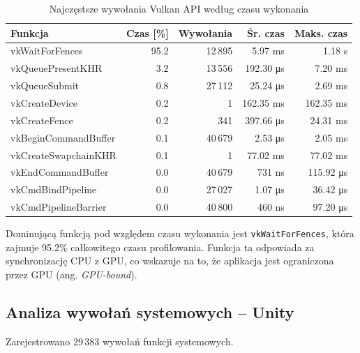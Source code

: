 \begin{table}[htbp]
\centering
\caption{Najczęstsze wywołania Vulkan API według czasu wykonania}
\label{tab:vulkan-time-unity-full-95s}
\begin{tabular}{|l|r|r|r|r|}
\hline
\textbf{Funkcja} & \textbf{Czas [\%]} & \textbf{Wywołania} & \textbf{Śr. czas} & \textbf{Maks. czas} \\
\hline
vkWaitForFences & 95.2 & 12\,895 & 5.97 ms & 1.18 s \\
vkQueuePresentKHR & 3.2 & 13\,556 & 192.30 μs & 7.20 ms \\
vkQueueSubmit & 0.8 & 27\,112 & 25.24 μs & 2.69 ms \\
vkCreateDevice & 0.2 & 1 & 162.35 ms & 162.35 ms \\
vkCreateFence & 0.2 & 341 & 397.66 μs & 24.31 ms \\
vkBeginCommandBuffer & 0.1 & 40\,679 & 2.53 μs & 2.05 ms \\
vkCreateSwapchainKHR & 0.1 & 1 & 77.02 ms & 77.02 ms \\
vkEndCommandBuffer & 0.0 & 40\,679 & 731 ns & 115.92 μs \\
vkCmdBindPipeline & 0.0 & 27\,027 & 1.07 μs & 36.42 μs \\
vkCmdPipelineBarrier & 0.0 & 40\,800 & 460 ns & 97.20 μs \\
\hline
\end{tabular}
\end{table}

Dominującą funkcją pod względem czasu wykonania jest
\texttt{vkWaitForFences}, która zajmuje
95.2\% całkowitego czasu profilowania.
Funkcja ta odpowiada za synchronizację CPU z GPU,
co wskazuje na to, że aplikacja jest ograniczona przez GPU
(ang. \textit{GPU-bound}).

\subsection{Analiza wywołań systemowych -- Unity}
\label{subsec:osrt-unity-full-95s}

Zarejestrowano 29\,383 wywołań funkcji systemowych.

